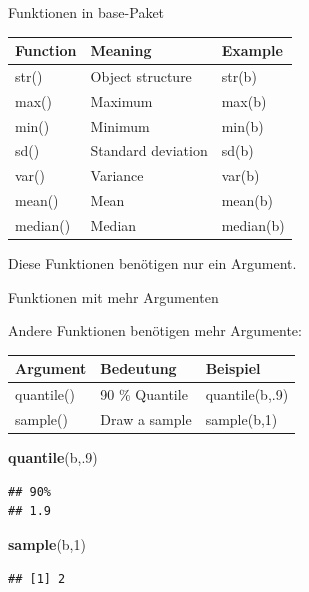 \documentclass[ignorenonframetext,]{beamer}
\newenvironment{Shaded}{\begin{snugshade}}{\end{snugshade}}
\newcommand{\DecValTok}[1]{\textcolor[rgb]{0.00,0.00,0.81}{#1}}
\newcommand{\KeywordTok}[1]{\textcolor[rgb]{0.13,0.29,0.53}{\textbf{#1}}}
\newcommand{\NormalTok}[1]{#1}
\begin{document}
\begin{frame}{Funktionen in base-Paket}
\protect\hypertarget{funktionen-in-base-paket}{}

\begin{longtable}[]{@{}lll@{}}
\toprule
Function & Meaning & Example\tabularnewline
\midrule
\endhead
str() & Object structure & str(b)\tabularnewline
max() & Maximum & max(b)\tabularnewline
min() & Minimum & min(b)\tabularnewline
sd() & Standard deviation & sd(b)\tabularnewline
var() & Variance & var(b)\tabularnewline
mean() & Mean & mean(b)\tabularnewline
median() & Median & median(b)\tabularnewline
\bottomrule
\end{longtable}

Diese Funktionen benötigen nur ein Argument.

\end{frame}

\begin{frame}[fragile]{Funktionen mit mehr Argumenten}
\protect\hypertarget{funktionen-mit-mehr-argumenten}{}

\begin{block}{Andere Funktionen benötigen mehr Argumente:}

\begin{longtable}[]{@{}lll@{}}
\toprule
Argument & Bedeutung & Beispiel\tabularnewline
\midrule
\endhead
quantile() & 90 \% Quantile & quantile(b,.9)\tabularnewline
sample() & Draw a sample & sample(b,1)\tabularnewline
\bottomrule
\end{longtable}

\begin{Shaded}
\begin{Highlighting}[]
\KeywordTok{quantile}\NormalTok{(b,.}\DecValTok{9}\NormalTok{)}
\end{Highlighting}
\end{Shaded}

\begin{verbatim}
## 90% 
## 1.9
\end{verbatim}

\begin{Shaded}
\begin{Highlighting}[]
\KeywordTok{sample}\NormalTok{(b,}\DecValTok{1}\NormalTok{) }
\end{Highlighting}
\end{Shaded}

\begin{verbatim}
## [1] 2
\end{verbatim}

\end{block}

\end{frame}
\end{document}
